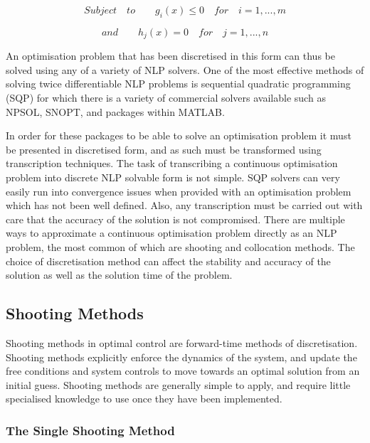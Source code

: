 \begin{equation}
Subject \quad to \qquad g_i(x)\leq0 \quad for \quad i=1,...,m
\end{equation}

\begin{equation}
and \qquad h_j(x) = 0 \quad for \quad j=1,...,n
\end{equation}

An optimisation problem that has been discretised in this form can thus be solved using any of a variety of NLP solvers. One of the most effective methods of solving twice differentiable NLP problems is sequential quadratic programming (SQP)\cite{Boggs2000} for which there is a variety of commercial solvers available such as NPSOL, SNOPT, and packages within MATLAB. 

In order for these packages to be able to solve an optimisation problem it must be presented in discretised form, and as such must be transformed using transcription techniques\cite{Kelly2015}. The task of transcribing a continuous optimisation problem into discrete NLP solvable form is not simple. SQP solvers can very easily run into convergence issues when provided with an optimisation problem which has not been well defined. Also, any transcription must be carried out with care that the accuracy of the solution is not compromised. 
There are multiple ways to approximate a continuous optimisation problem directly as an NLP problem, the most common of which are shooting and collocation methods. The choice of discretisation method can affect the stability and accuracy of the solution as well as the solution time of the problem. 

\subsection{Shooting Methods}

Shooting methods in optimal control are forward-time methods of discretisation\cite{Kelly2015}. Shooting methods explicitly enforce the dynamics of the system, and update the free conditions and system controls to move towards an optimal solution from an initial guess\cite{Kelly2015}. Shooting methods are generally simple to apply, and require little specialised knowledge to use once they have been implemented. 


\subsubsection{The Single Shooting Method}

